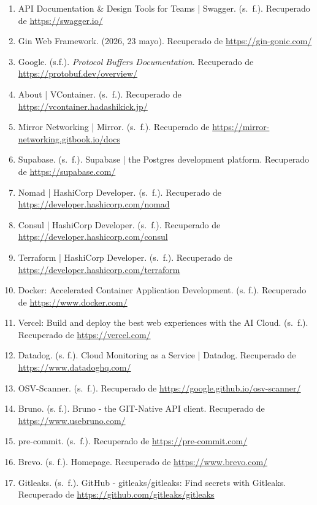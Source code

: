 \begin{enumerate}
  \item API Documentation & Design Tools for Teams | Swagger. (s. f.). Recuperado de \url{https://swagger.io/}
  \item Gin Web Framework. (2026, 23 mayo). Recuperado de \url{https://gin-gonic.com/}
  \item Google. (s.f.). \textit{Protocol Buffers Documentation}. Recuperado de \url{https://protobuf.dev/overview/}
  \item About | VContainer. (s. f.). Recuperado de \url{https://vcontainer.hadashikick.jp/}
  \item Mirror Networking | Mirror. (s. f.). Recuperado de \url{https://mirror-networking.gitbook.io/docs}
  \item Supabase. (s. f.). Supabase | the Postgres development platform. Recuperado de \url{https://supabase.com/}
  \item Nomad | HashiCorp Developer. (s. f.). Recuperado de \url{https://developer.hashicorp.com/nomad}
  \item Consul | HashiCorp Developer. (s. f.). Recuperado de \url{https://developer.hashicorp.com/consul}
  \item Terraform | HashiCorp Developer. (s. f.). Recuperado de \url{https://developer.hashicorp.com/terraform}
  \item Docker: Accelerated Container Application Development. (s. f.). Recuperado de \url{https://www.docker.com/}
  \item Vercel: Build and deploy the best web experiences with the AI Cloud. (s. f.). Recuperado de \url{https://vercel.com/}
  \item Datadog. (s. f.). Cloud Monitoring as a Service | Datadog. Recuperado de \url{https://www.datadoghq.com/}
  \item OSV-Scanner. (s. f.). Recuperado de \url{https://google.github.io/osv-scanner/}
  \item Bruno. (s. f.). Bruno - the GIT-Native API client. Recuperado de \url{https://www.usebruno.com/}
  \item pre-commit. (s. f.). Recuperado de \url{https://pre-commit.com/}
  \item Brevo. (s. f.). Homepage. Recuperado de \url{https://www.brevo.com/}
  \item Gitleaks. (s. f.). GitHub - gitleaks/gitleaks: Find secrets with Gitleaks. Recuperado de \url{https://github.com/gitleaks/gitleaks}
\end{enumerate} 
